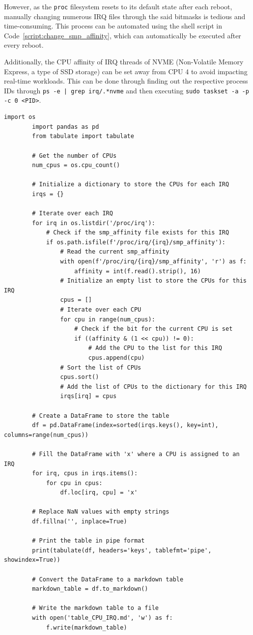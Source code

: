 \documentclass[MMR,Master,english]{style/twbook}
\begin{document}
\bigskip \noindent However, as the \texttt{proc} filesystem resets to its default state after each reboot, manually changing numerous IRQ files through the said bitmasks is tedious and time-consuming. This process can be automated using the shell script in Code~\ref{script:change_smp_affinity}, which can automatically be executed after every reboot.

\bigskip \noindent Additionally, the CPU affinity of IRQ threads of NVME (Non-Volatile Memory Express, a type of SSD storage) can be set away from CPU 4 to avoid impacting real-time workloads. This can be done through finding out the respective process IDs through \texttt{ps -e | grep irq/.*nvme} and then executing \texttt{sudo taskset -a -p -c 0 <PID>}.

\clearpage

\vspace*{-5em}
\begin{lstlisting}[name={Code to show a table of the distribution of interrupt requests across each CPU},label={script:smp_affinity}]
		import os
		import pandas as pd
		from tabulate import tabulate
		
		# Get the number of CPUs
		num_cpus = os.cpu_count()
		
		# Initialize a dictionary to store the CPUs for each IRQ
		irqs = {}
		
		# Iterate over each IRQ
		for irq in os.listdir('/proc/irq'):
			# Check if the smp_affinity file exists for this IRQ
			if os.path.isfile(f'/proc/irq/{irq}/smp_affinity'):
				# Read the current smp_affinity
				with open(f'/proc/irq/{irq}/smp_affinity', 'r') as f:
					affinity = int(f.read().strip(), 16)
				# Initialize an empty list to store the CPUs for this IRQ
				cpus = []
				# Iterate over each CPU
				for cpu in range(num_cpus):
					# Check if the bit for the current CPU is set
					if ((affinity & (1 << cpu)) != 0):
						# Add the CPU to the list for this IRQ
						cpus.append(cpu)
				# Sort the list of CPUs
				cpus.sort()
				# Add the list of CPUs to the dictionary for this IRQ
				irqs[irq] = cpus
		
		# Create a DataFrame to store the table
		df = pd.DataFrame(index=sorted(irqs.keys(), key=int), columns=range(num_cpus))
		
		# Fill the DataFrame with 'x' where a CPU is assigned to an IRQ
		for irq, cpus in irqs.items():
			for cpu in cpus:
				df.loc[irq, cpu] = 'x'
		
		# Replace NaN values with empty strings
		df.fillna('', inplace=True)
		
		# Print the table in pipe format
		print(tabulate(df, headers='keys', tablefmt='pipe', showindex=True))
		
		# Convert the DataFrame to a markdown table
		markdown_table = df.to_markdown()
		
		# Write the markdown table to a file
		with open('table_CPU_IRQ.md', 'w') as f:
			f.write(markdown_table)
\end{lstlisting}
\end{document}
